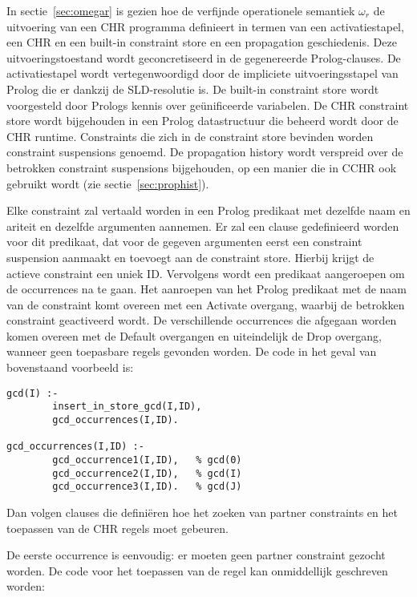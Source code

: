 In sectie~\ref{sec:omegar} is gezien hoe de verfijnde operationele semantiek $\omega_r$ de uitvoering van een CHR programma definieert in termen van een activatiestapel, een CHR en een built-in constraint store en een propagation geschiedenis. Deze uitvoeringstoestand wordt geconcretiseerd in de gegenereerde Prolog-clauses. De activatiestapel wordt vertegenwoordigd door de impliciete uitvoeringsstapel van Prolog die er dankzij de SLD-resolutie is. De built-in constraint store wordt voorgesteld door Prologs kennis over ge\"unificeerde variabelen. De CHR constraint store wordt bijgehouden in een Prolog datastructuur die beheerd wordt door de CHR runtime. Constraints die zich in de constraint store bevinden worden constraint suspensions genoemd. De propagation history wordt verspreid over de betrokken constraint suspensions bijgehouden, op een manier die in CCHR ook gebruikt wordt (zie sectie~\ref{sec:prophist}).

Elke constraint zal vertaald worden in een Prolog predikaat met dezelfde naam en ariteit en dezelfde argumenten aannemen. Er zal een clause gedefinieerd worden voor dit predikaat, dat voor de gegeven argumenten eerst een constraint suspension aanmaakt en toevoegt aan de constraint store. Hierbij krijgt de actieve constraint een uniek ID. Vervolgens wordt een predikaat aangeroepen om de occurrences na te gaan. Het aanroepen van het Prolog predikaat met de naam van de constraint komt overeen met een Activate overgang, waarbij de betrokken constraint geactiveerd wordt. De verschillende occurrences die afgegaan worden komen overeen met de Default overgangen en uiteindelijk de Drop overgang, wanneer geen toepasbare regels gevonden worden. De code in het geval van bovenstaand voorbeeld is:

{\scriptsize \begin{Verbatim}[frame=single]
gcd(I) :-
        insert_in_store_gcd(I,ID),
        gcd_occurrences(I,ID).

gcd_occurrences(I,ID) :-
        gcd_occurrence1(I,ID),   % gcd(0)
        gcd_occurrence2(I,ID),   % gcd(I)
        gcd_occurrence3(I,ID).   % gcd(J)
\end{Verbatim}
}

Dan volgen clauses die defini\"eren hoe het zoeken van partner constraints en het toepassen van de CHR regels moet gebeuren.

De eerste occurrence is eenvoudig: er moeten geen partner constraint gezocht worden. De code voor het toepassen van de regel kan onmiddellijk geschreven worden:

